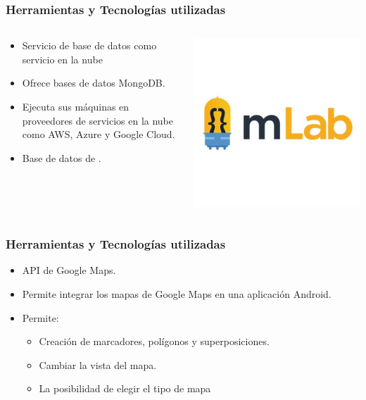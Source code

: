 \begin{frame}
	\frametitle{Herramientas y Tecnologías utilizadas}
	\begin{columns}
			\begin{column}{0.6\textwidth}
					\begin{itemize}
						\item {Servicio de base de datos como servicio en la nube}
						\item {Ofrece bases de datos MongoDB}.
						\item {Ejecuta sus máquinas en proveedores de servicios en la nube como AWS, Azure y Google Cloud.}
						\item {Base de datos de \ULLAR{}.}
					\end{itemize}
				\endblock{}
			\end{column}
			\begin{column}{0.4\textwidth}
				\vfill 
					\begin{center}
						\includegraphics[width=0.8\linewidth]{Images/mlab}
					\end{center}
			\end{column}
	\end{columns}
\end{frame}

\begin{frame}
	\frametitle{Herramientas y Tecnologías utilizadas}
			\begin{itemize}
				\item {API de Google Maps.}
				\item {Permite integrar los mapas de Google Maps en una aplicación Android.}
				\item {Permite:}
				\begin{itemize}
					\item {Creación de marcadores, polígonos y superposiciones.}
					\item {Cambiar la vista del mapa.}
					\item {La posibilidad de elegir el tipo de mapa}
				\end{itemize}
			\end{itemize}
		\endblock{}
\end{frame}

